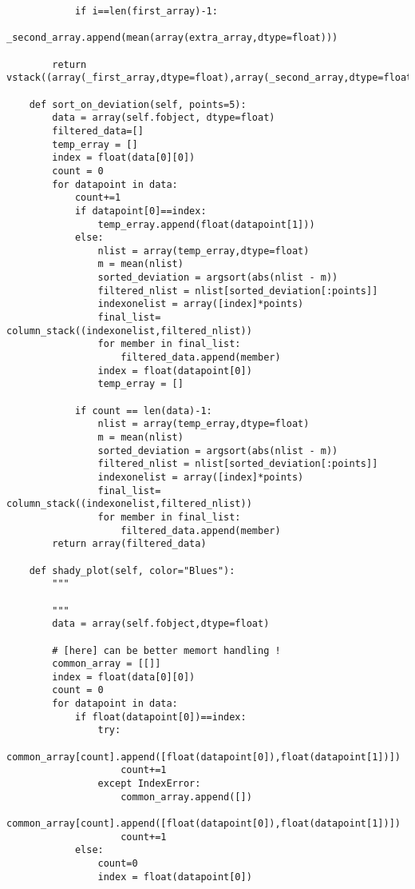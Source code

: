 \begin{verbatim}
            if i==len(first_array)-1:
                _second_array.append(mean(array(extra_array,dtype=float)))

        return vstack((array(_first_array,dtype=float),array(_second_array,dtype=float))).T
                
    def sort_on_deviation(self, points=5):
        data = array(self.fobject, dtype=float)
        filtered_data=[]
        temp_erray = []
        index = float(data[0][0])
        count = 0
        for datapoint in data:
            count+=1
            if datapoint[0]==index:
                temp_erray.append(float(datapoint[1]))
            else:
                nlist = array(temp_erray,dtype=float)
                m = mean(nlist)
                sorted_deviation = argsort(abs(nlist - m))
                filtered_nlist = nlist[sorted_deviation[:points]]
                indexonelist = array([index]*points)
                final_list= column_stack((indexonelist,filtered_nlist))
                for member in final_list:
                    filtered_data.append(member)
                index = float(datapoint[0])
                temp_erray = []

            if count == len(data)-1:
                nlist = array(temp_erray,dtype=float)
                m = mean(nlist)
                sorted_deviation = argsort(abs(nlist - m))
                filtered_nlist = nlist[sorted_deviation[:points]]
                indexonelist = array([index]*points)
                final_list= column_stack((indexonelist,filtered_nlist))
                for member in final_list:
                    filtered_data.append(member)
        return array(filtered_data)
    
    def shady_plot(self, color="Blues"):
        """
        
        """
        data = array(self.fobject,dtype=float)
        
        # [here] can be better memort handling !
        common_array = [[]]
        index = float(data[0][0])
        count = 0
        for datapoint in data:
            if float(datapoint[0])==index:
                try:
                    common_array[count].append([float(datapoint[0]),float(datapoint[1])])
                    count+=1
                except IndexError:
                    common_array.append([])
                    common_array[count].append([float(datapoint[0]),float(datapoint[1])])
                    count+=1
            else:
                count=0
                index = float(datapoint[0])
        

\end{verbatim}
